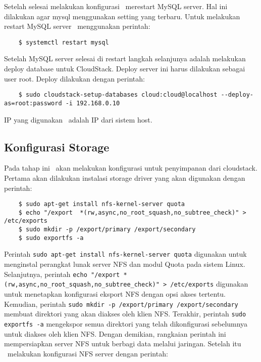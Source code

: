 Setelah selesai melakukan konfigurasi \saya\ merestart MySQL server. Hal ini dilakukan agar mysql menggunakan setting yang terbaru. Untuk melakukan restart MySQL server \saya\ menggunakan perintah:

\begin{listing}[H]
    \begin{verbatim}     
    $ systemctl restart mysql
    \end{verbatim}
\end{listing}

Setelah MySQL server selesai di restart langkah selanjunya adalah melakukan deploy database untuk CloudStack. Deploy server ini harus dilakukan sebagai user root. Deploy dilakukan dengan perintah:

\begin{listing}[H]
    \begin{verbatim}       
    $ sudo cloudstack-setup-databases cloud:cloud@localhost --deploy-as=root:password -i 192.168.0.10
    \end{verbatim}
\end{listing}

IP yang digunakan \saya\ adalah IP dari sistem host.

\subsection{Konfigurasi Storage}
Pada tahap ini \saya\ akan melakukan konfigurasi untuk penyimpanan dari cloudstack. Pertama akan dilakukan instalasi storage driver yang akan digunakan dengan perintah:

\begin{listing}[H]
    \begin{verbatim}       
    $ sudo apt-get install nfs-kernel-server quota
    $ echo "/export  *(rw,async,no_root_squash,no_subtree_check)" > /etc/exports
    $ sudo mkdir -p /export/primary /export/secondary
    $ sudo exportfs -a
    \end{verbatim}
\end{listing}

Perintah \texttt{sudo apt-get install nfs-kernel-server quota} digunakan untuk menginstal perangkat lunak server NFS dan modul Quota pada sistem Linux. Selanjutnya, perintah \texttt{echo "/export *(rw,async,no\_root\_squash,no\_subtree\_check)" > /etc/exports} digunakan untuk menetapkan konfigurasi eksport NFS dengan opsi akses tertentu. Kemudian, perintah \texttt{sudo mkdir -p /export/primary /export/secondary} membuat direktori yang akan diakses oleh klien NFS. Terakhir, perintah \texttt{sudo exportfs -a} mengekspor semua direktori yang telah dikonfigurasi sebelumnya untuk diakses oleh klien NFS. Dengan demikian, rangkaian perintah ini mempersiapkan server NFS untuk berbagi data melalui jaringan. Setelah itu \saya\ melakukan konfigurasi NFS server dengan perintah:

